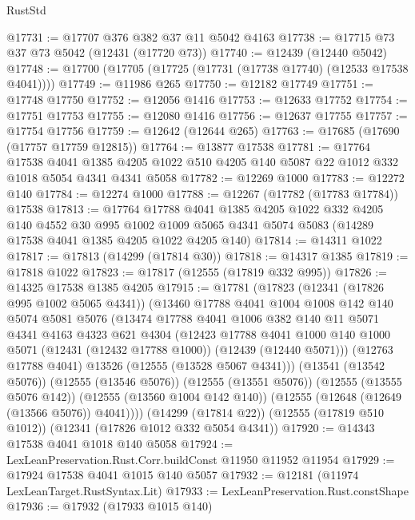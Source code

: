 \begin{lexlean}{RustStd}
\begin{coremodule}
@17731 := @17707 @376 @382 @37 @11 @5042 @4163
@17738 := @17715 @73 @37 @73 @5042 (@12431 (@17720 @73))
@17740 := @12439 (@12440 @5042)
@17748 := @17700 (@17705 (@17725 (@17731 (@17738 @17740) (@12533 @17538 @4041))))
@17749 := @11986 @265
@17750 := @12182 @17749
@17751 := @17748 @17750
@17752 := @12056 @1416
@17753 := @12633 @17752
@17754 := @17751 @17753
@17755 := @12080 @1416
@17756 := @12637 @17755
@17757 := @17754 @17756
@17759 := @12642 (@12644 @265)
@17763 := @17685 (@17690 (@17757 @17759 @12815))
@17764 := @13877 @17538
@17781 := @17764
    @17538
    @4041
    @1385
    @4205
    @1022
    @510
    @4205
    @140
    @5087
    @22
    @1012
    @332
    @1018
    @5054
    @4341
    @4341
    @5058
@17782 := @12269 @1000
@17783 := @12272 @140
@17784 := @12274 @1000
@17788 := @12267 (@17782 (@17783 @17784)) @17538
@17813 := @17764
    @17788
    @4041
    @1385
    @4205
    @1022
    @332
    @4205
    @140
    @4552
    @30
    @995
    @1002
    @1009
    @5065
    @4341
    @5074
    @5083
    (@14289 @17538 @4041 @1385 @4205 @1022 @4205 @140)
@17814 := @14311 @1022
@17817 := @17813 (@14299 (@17814 @30))
@17818 := @14317 @1385
@17819 := @17818 @1022
@17823 := @17817 (@12555 (@17819 @332 @995))
@17826 := @14325 @17538 @1385 @4205
@17915 := @17781
    (@17823
      (@12341 (@17826 @995 @1002 @5065 @4341))
      (@13460
        @17788
        @4041
        @1004
        @1008
        @142
        @140
        @5074
        @5081
        @5076
        (@13474
          @17788
          @4041
          @1006
          @382
          @140
          @11
          @5071
          @4341
          @4163
          @4323
          @621
          @4304
          (@12423
            @17788
            @4041
            @1000
            @140
            @1000
            @5071
            (@12431 (@12432 @17788 @1000))
            (@12439 (@12440 @5071)))
          (@12763 @17788 @4041)
          @13526
          (@12555 (@13528 @5067 @4341)))
        (@13541 (@13542 @5076))
        (@12555 (@13546 @5076))
        (@12555 (@13551 @5076))
        (@12555 (@13555 @5076 @142))
        (@12555 (@13560 @1004 @142 @140))
        (@12555 (@12648 (@12649 (@13566 @5076)) @4041))))
    (@14299 (@17814 @22))
    (@12555 (@17819 @510 @1012))
    (@12341 (@17826 @1012 @332 @5054 @4341))
@17920 := @14343 @17538 @4041 @1018 @140 @5058
@17924 := LexLeanPreservation.Rust.Corr.buildConst @11950 @11952 @11954
@17929 := @17924 @17538 @4041 @1015 @140 @5057
@17932 := @12181 (@11974 LexLeanTarget.RustSyntax.Lit)
@17933 := LexLeanPreservation.Rust.constShape
@17936 := @17932 (@17933 @1015 @140)

\end{coremodule}
\end{lexlean}
